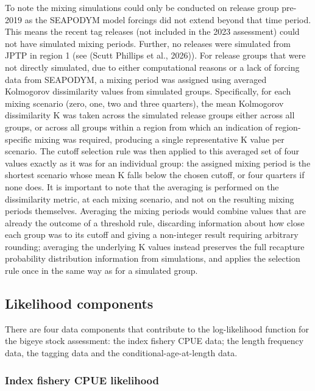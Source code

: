 \documentclass[
  english,
  a4paper,
  a4paper,
  11pt]{SCreport}
\newcounter{none} %
\begin{document}
To note the mixing simulations could only be conducted on release group
pre-2019 as the SEAPODYM model forcings did not extend beyond that time
period. This means the recent tag releases (not included in the 2023
assessment) could not have simulated mixing periods. Further, no
releases were simulated from JPTP in region 1 (see (Scutt Phillips et
al., 2026)). For release groups that were not directly simulated, due to
either computational reasons or a lack of forcing data from SEAPODYM, a
mixing period was assigned using averaged Kolmogorov dissimilarity
values from simulated groups. Specifically, for each mixing scenario
(zero, one, two and three quarters), the mean Kolmogorov dissimilarity K
was taken across the simulated release groups either across all groups,
or across all groups within a region from which an indication of
region-specific mixing was required, producing a single representative K
value per scenario. The cutoff selection rule was then applied to this
averaged set of four values exactly as it was for an individual group:
the assigned mixing period is the shortest scenario whose mean K falls
below the chosen cutoff, or four quarters if none does. It is important
to note that the averaging is performed on the dissimilarity metric, at
each mixing scenario, and not on the resulting mixing periods
themselves. Averaging the mixing periods would combine values that are
already the outcome of a threshold rule, discarding information about
how close each group was to its cutoff and giving a non-integer result
requiring arbitrary rounding; averaging the underlying K values instead
preserves the full recapture probability distribution information from
simulations, and applies the selection rule once in the same way as for
a simulated group.

\subsection{Likelihood components}\label{sec-likelihood-components}

There are four data components that contribute to the log-likelihood
function for the bigeye stock assessment: the index fishery CPUE data;
the length frequency data, the tagging data and the
conditional-age-at-length data.

\subsubsection{Index fishery CPUE
likelihood}\label{sec-indexCPUE-likelihood}
\end{document}
